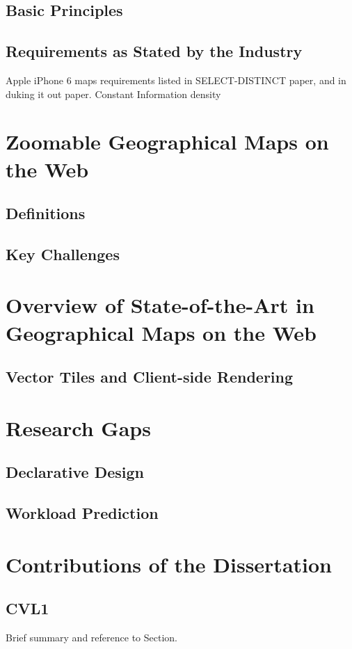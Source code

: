 \documentclass[11pt, oneside]{report}   	%
\begin{document}
\subsection{Basic Principles}
\subsection{Requirements as Stated by the Industry}
Apple iPhone 6 maps requirements listed in SELECT-DISTINCT paper, and in duking it out paper. Constant Information density

\section{Zoomable Geographical Maps on the Web}
\subsection{Definitions}
\subsection{Key Challenges}

\section{Overview of State-of-the-Art in Geographical Maps on the Web}
\subsection{Vector Tiles and Client-side Rendering}


\section{Research Gaps}
\subsection{Declarative Design}
\subsection{Workload Prediction}

\section{Contributions of the Dissertation}

\subsection{CVL1}
Brief summary and reference to Section.
\end{document}
